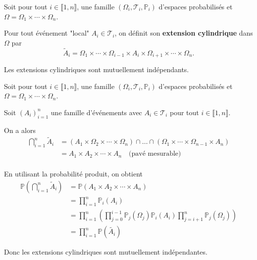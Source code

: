 \documentclass[a4paper,12pt]{article}
\begin{document}
\begin{definition}
    Soit pour tout $i \in \llbracket 1, n \rrbracket$, une famille $(\Omega_i, \mathcal{T}_i, \mathbb{P}_i)$ d'espaces probabilisés et
    $\Omega = \Omega_1 \times \cdots \times \Omega_n$.

    Pour tout événement "local" $A_i \in \mathcal{T}_i$, on définit son \textbf{extension cylindrique} dans $\Omega$ par
    $$
    \tilde{A}_i = \Omega_1 \times \cdots \times \Omega_{i-1} \times A_i \times \Omega_{i+1} \times \cdots \times \Omega_n.
    $$
\end{definition}

\begin{proposition}{}{}
    Les extensions cylindriques sont mutuellement indépendants.
\end{proposition}

\begin{demonstration}
    Soit pour tout $i \in \llbracket 1, n \rrbracket$, une famille $(\Omega_i, \mathcal{T}_i, \mathbb{P}_i)$ d'espaces probabilisés et
    $\Omega = \Omega_1 \times \cdots \times \Omega_n$.

    Soit $(A_i)_{i=1}^n$ une famille d'événements avec $A_i \in \mathcal{T}_i$ pour tout $i \in \llbracket 1, n \rrbracket$.

    On a alors
    \begin{align*}
        \bigcap_{i=1}^n \tilde{A}_i &= (A_1 \times \Omega_2 \times \cdots \times \Omega_n) \cap \ldots \cap (\Omega_1 \times \cdots \times \Omega_{n-1} \times A_n) \\
        &= A_1 \times A_2 \times \cdots \times A_n \quad \text{(pavé mesurable)} \\
    \end{align*}

    En utilisant la probabilité produit, on obtient
    \begin{align*}
        \mathbb{P}\left( \bigcap_{i=1}^n \tilde{A}_i \right) &= \mathbb{P}(A_1 \times A_2 \times \cdots \times A_n) \\
        &= \prod_{i=1}^n \mathbb{P}_i(A_i) \\
        &= \prod_{i=1}^n \left( \prod_{j=0}^{i-1} \mathbb{P}_j(\Omega_j) \mathbb{P}_i(A_i) \prod_{j=i+1}^n \mathbb{P}_j(\Omega_j) \right) \\
        &= \prod_{i=1}^n \mathbb{P}(\tilde{A_i})
    \end{align*}

    Donc les extensions cylindriques sont mutuellement indépendantes.
\end{demonstration}
\end{document}
